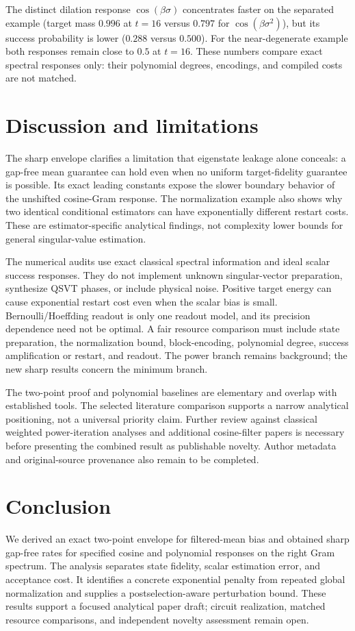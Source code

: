 \documentclass[11pt]{article}
\begin{document}
The distinct dilation response $\cos(\beta\sigma)$ concentrates faster on the separated example (target mass $0.996$ at $t=16$ versus $0.797$ for $\cos(\beta\sigma^2)$), but its success probability is lower ($0.288$ versus $0.500$). For the near-degenerate example both responses remain close to $0.5$ at $t=16$. These numbers compare exact spectral responses only: their polynomial degrees, encodings, and compiled costs are not matched.


\section{Discussion and limitations}
The sharp envelope clarifies a limitation that eigenstate leakage alone conceals: a gap-free mean guarantee can hold even when no uniform target-fidelity guarantee is possible. Its exact leading constants expose the slower boundary behavior of the unshifted cosine-Gram response. The normalization example also shows why two identical conditional estimators can have exponentially different restart costs. These are estimator-specific analytical findings, not complexity lower bounds for general singular-value estimation.

The numerical audits use exact classical spectral information and ideal scalar success responses. They do not implement unknown singular-vector preparation, synthesize QSVT phases, or include physical noise. Positive target energy can cause exponential restart cost even when the scalar bias is small. Bernoulli/Hoeffding readout is only one readout model, and its precision dependence need not be optimal. A fair resource comparison must include state preparation, the normalization bound, block-encoding, polynomial degree, success amplification or restart, and readout. The power branch remains background; the new sharp results concern the minimum branch.

The two-point proof and polynomial baselines are elementary and overlap with established tools. The selected literature comparison supports a narrow analytical positioning, not a universal priority claim. Further review against classical weighted power-iteration analyses and additional cosine-filter papers is necessary before presenting the combined result as publishable novelty. Author metadata and original-source provenance also remain to be completed.

\section{Conclusion}
We derived an exact two-point envelope for filtered-mean bias and obtained sharp gap-free rates for specified cosine and polynomial responses on the right Gram spectrum. The analysis separates state fidelity, scalar estimation error, and acceptance cost. It identifies a concrete exponential penalty from repeated global normalization and supplies a postselection-aware perturbation bound. These results support a focused analytical paper draft; circuit realization, matched resource comparisons, and independent novelty assessment remain open.
\end{document}

